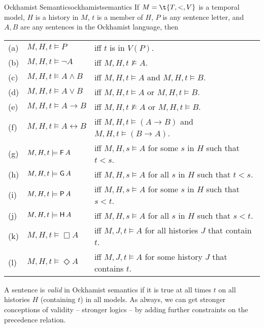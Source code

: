 \begin{definition}{Ockhamist Semantics}{ockhamistsemantics}
  If $M = \t{T,<,V}$ is a temporal model, $H$ is a history in $M$, $t$
  is a member of $H$, $P$ is any sentence letter, and $A,B$ are any
  sentences in the Ockhamist language, then

  \medskip
  \begin{tabular}{lll}
    (a) & $M,H,t \models P$ &iff $t$ is in $V(P)$.\\
    (b) & $M,H,t \models \neg A$ &iff $M,H,t \not\models A$.\\
    (c) & $M,H,t \models A \land B$ &iff $M,H,t \models A$ and $M,H,t \models B$.\\
    (d) & $M,H,t \models A \lor B$ &iff $M,H,t \models A$ or $M,H,t \models B$.\\
    (e) & $M,H,t \models A \to B$ &iff $M,H,t \not\models A$ or $M,H,t \models B$.\\
    (f) & $M,H,t \models A \leftrightarrow B$ &iff $M,H,t \models (A\to B)$ and $M,H,t \models (B\to A)$.\\
    (g) & $M,H,t \models \operatorname{\mathsf{F}} A$ &iff $M,H,s \models A$ for some $s$ in $ H$ such that $t<s$.\\
    (h) & $M,H,t \models \operatorname{\mathsf{G}} A$ &iff $M,H,s \models A$ for all $s$ in $ H$ such that $t<s$.\\
    (i) & $M,H,t \models \operatorname{\mathsf{P}} A$ &iff $M,H,s \models A$ for some $s$ in $ H$ such that $s<t$.\\
    (j) & $M,H,t \models \operatorname{\mathsf{H}} A$ &iff $M,H,s \models A$ for all $s$ in $ H$ such that $s<t$.\\
    (k) & $M,H,t \models \Box A$ &iff $M,J,t \models A$ for all histories $J$ that contain $t$.\\
    (l) & $M,H,t \models \Diamond A$ &iff $M,J,t \models A$ for some history $J$ that contains $t$.
  \end{tabular}
\end{definition}


A sentence is \emph{valid} in Ockhamist semantics if it is true at all times $t$
on all histories $H$ (containing $t$) in all models. As always, we can get
stronger conceptions of validity -- stronger logics -- by adding further
constraints on the precedence relation.


